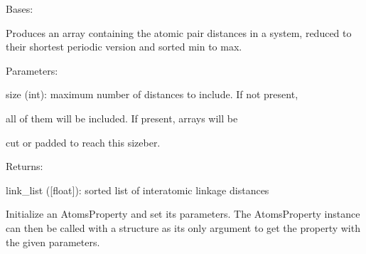 \documentclass[letterpaper,10pt,english]{sphinxmanual}
\begin{document}
\begin{fulllineitems}
\label{doctree/soprano.properties.linkage.linkage:soprano.properties.linkage.linkage.LinkageList}
Bases: {\hyperref[doctree/soprano.properties.atomsproperty:soprano.properties.atomsproperty.AtomsProperty]{\emph{}}}

Produces an array containing the atomic pair distances in a system,
reduced to their shortest periodic version and sorted min to max.

\begin{DUlineblock}{0em}
\item[] Parameters:
\item[]
\begin{DUlineblock}{\DUlineblockindent}
\item[] size (int): maximum number of distances to include. If not present,
\item[]
\begin{DUlineblock}{\DUlineblockindent}
\item[] all of them will be included. If present, arrays will be
\item[] cut or padded to reach this sizeber.
\end{DUlineblock}
\end{DUlineblock}
\end{DUlineblock}

\begin{DUlineblock}{0em}
\item[] Returns:
\item[]
\begin{DUlineblock}{\DUlineblockindent}
\item[] link\_list ({[}float{]}): sorted list of interatomic linkage distances
\end{DUlineblock}
\end{DUlineblock}

Initialize an AtomsProperty and set its parameters.
The AtomsProperty instance can then be called with a structure as its
only argument to get the property with the given parameters.


\end{fulllineitems}
\end{document}
